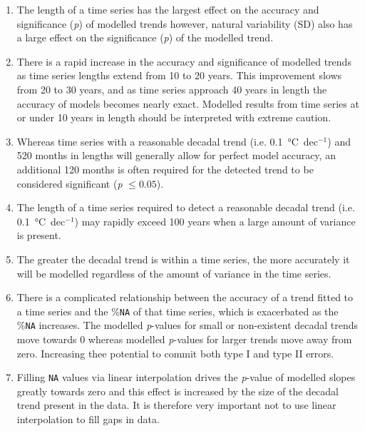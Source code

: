 \documentclass[]{ametsoc}
\begin{document}
\begin{enumerate}
\item The length of a time series has the largest effect on the accuracy and significance (\emph{p}) of modelled trends however, natural variability (SD) also has a large effect on the significance (\emph{p}) of the modelled trend.

\item There is a rapid increase in the accuracy and significance of modelled trends as time series lengths extend from 10 to 20 years. This improvement slows from 20 to 30 years, and as time series approach 40 years in length the accuracy of models becomes nearly exact. Modelled results from time series at or under 10 years in length should be interpreted with extreme caution.

\item Whereas time series with a reasonable decadal trend (i.e. \SI{0.1}{\degreeCelsius}~dec$^{-1}$) and 520 months in lengths will generally allow for perfect model accuracy, an additional 120 months is often required for the detected trend to be considered significant (\emph{p} $\leq 0.05$).


\item The length of a time series required to detect a reasonable decadal trend (i.e. \SI{0.1}{\degreeCelsius}~dec$^{-1}$) may rapidly exceed 100 years when a large amount of variance is present.


\item The greater the decadal trend is within a time series, the more accurately it will be modelled regardless of the amount of variance in the time series.


\item There is a complicated relationship between the accuracy of a trend fitted to a time series and the \%\texttt{NA} of that time series, which is exacerbated as the \%\texttt{NA} increases. The modelled \emph{p}-values for small or non-existent decadal trends move towards 0 whereas modelled \emph{p}-values for larger trends move away from zero. Increasing thee potential to commit both type I and type II errors.

\item Filling \texttt{NA} values via linear interpolation drives the \emph{p}-value of modelled slopes greatly towards zero and this effect is increased by the size of the decadal trend present in the data. It is therefore very important not to use linear interpolation to fill gaps in data.



\end{enumerate}
\end{document}
